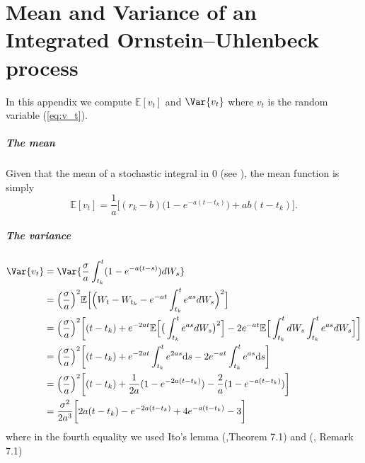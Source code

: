 

\chapter{Mean and Variance of an Integrated Ornstein–Uhlenbeck process}\label{app:IntegratedOU}
In this appendix we compute $\mathbb{E}[v_t]$ and $\Var{v_t}$ where $v_t$ is the random variable (\ref{eq:v_t}).
\paragraph{The mean}
Given that the mean of a stochastic integral in 0 (see \cite{baldi2017}), the mean function is simply
\begin{equation}
\mathbb{E}[v_t]= \frac{1}{a}\Big[(r_k - b)\big(1-e^{-a(t-t_k)}\big)+ab(t-t_k)\Big].
\end{equation}


\paragraph{The variance}
\begin{align*}
\nonumber
\Var{v_t} & = \Var{\frac{\sigma}{a}\int_{t_k}^{t}(1-e^{-a(t-s)})dW_s}\\
& = \Big(\frac{\sigma}{a}\Big)^2\mathbb{E}\Big[\Big(W_t-W_{t_k}-e^{-at}\int_{t_k}^{t}e^{as}dW_s\Big)^2\Big]\\
& = \Big(\frac{\sigma}{a}\Big)^2\bigg[(t-t_k)+e^{-2at}\mathbb{E}\Big[\big(\int_{t_k}^{t}e^{as}dW_s\big)^2\Big]-2e^{-at}\mathbb{E}\Big[\int_{t_k}^{t}dW_s\int_{t_k}^{t}e^{as}dW_s\Big] \bigg]\\
& = \Big(\frac{\sigma}{a}\Big)^2\bigg[(t-t_k)+e^{-2at}\int_{t_k}^{t}e^{2as}\mathrm{d}s-2e^{-at}\int_{t_k}^{t}e^{as}\mathrm{d}s\bigg]\\
& = \Big(\frac{\sigma}{a}\Big)^2\bigg[(t-t_k)+\frac{1}{2a}(1-e^{-2a(t-t_k)})-\frac{2}{a}(1-e^{-a(t-t_k)})\bigg] \\
& = \frac{\sigma^2}{2a^3}\bigg[2a(t-t_k)-e^{-2a(t-t_k)}+4e^{-a(t-t_k)}-3\bigg]
\end{align*}
where in the fourth equality we used Ito's lemma (\cite{baldi2017},Theorem 7.1) and (\cite{baldi2017}, Remark 7.1)


